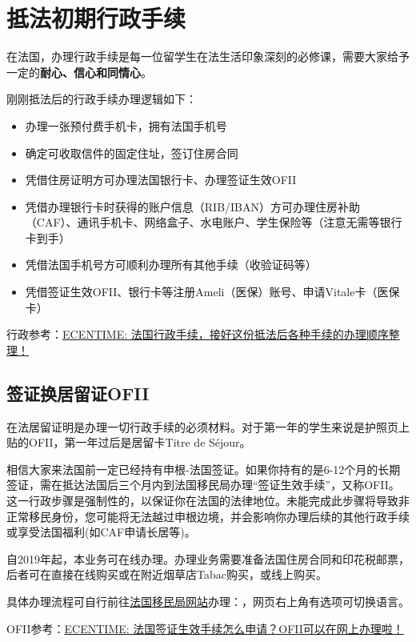 \section{抵法初期行政手续}

在法国，办理行政手续是每一位留学生在法生活印象深刻的必修课，需要大家给予一定的\textbf{耐心、信心和同情心}。

刚刚抵法后的行政手续办理逻辑如下：
\begin{itemize}
    \item 办理一张预付费手机卡，拥有法国手机号
    \item 确定可收取信件的固定住址，签订住房合同
    \item 凭借住房证明方可办理法国银行卡、办理签证生效OFII
    \item 凭借办理银行卡时获得的账户信息（RIB/IBAN）方可办理住房补助（CAF）、通讯手机卡、网络盒子、水电账户、学生保险等（注意无需等银行卡到手）
    \item 凭借法国手机号方可顺利办理所有其他手续（收验证码等）
    \item 凭借签证生效OFII、银行卡等注册Ameli（医保）账号、申请Vitale卡（医保卡）
\end{itemize}

行政参考：\href{https://www.ecentime.com/article/demarches-etudiant-arrivant}{ECENTIME: 法国行政手续，接好这份抵法后各种手续的办理顺序整理！}
 
\subsection{签证换居留证OFII}
在法居留证明是办理一切行政手续的必须材料。对于第一年的学生来说是护照页上贴的OFII，第一年过后是居留卡Titre de Séjour。

相信大家来法国前一定已经持有申根-法国签证。如果你持有的是6-12个月的长期签证，需在抵达法国后三个月内到法国移民局办理“签证生效手续”，又称OFII。 这一行政步骤是强制性的，以保证你在法国的法律地位。未能完成此步骤将导致非正常移民身份，您可能将无法越过申根边境，并会影响你办理后续的其他行政手续或享受法国福利(如CAF申请长居等)。

自2019年起，本业务可在线办理。办理业务需要准备法国住房合同和印花税邮票，后者可在直接在线购买或在附近烟草店Tabac购买，或线上购买。

具体办理流程可自行前往\href{https://administration-etrangers-en-france.interieur.gouv.fr}{法国移民局网站}办理：，网页右上角有选项可切换语言。

OFII参考：\href{https://www.ecentime.com/article/tuto-ofii}{ECENTIME: 法国签证生效手续怎么申请？OFII可以在网上办理啦！}
 

